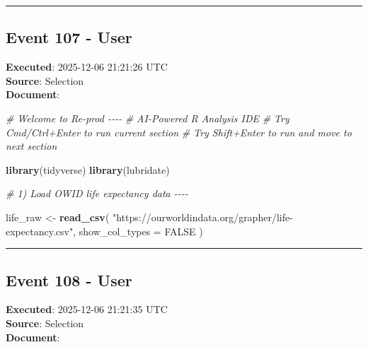 \documentclass[
  11pt,
]{article}
\newenvironment{Shaded}{\begin{snugshade}}{\end{snugshade}}
\newcommand{\AttributeTok}[1]{\textcolor[rgb]{0.13,0.29,0.53}{#1}}
\newcommand{\CommentTok}[1]{\textcolor[rgb]{0.56,0.35,0.01}{\textit{#1}}}
\newcommand{\ConstantTok}[1]{\textcolor[rgb]{0.56,0.35,0.01}{#1}}
\newcommand{\FunctionTok}[1]{\textcolor[rgb]{0.13,0.29,0.53}{\textbf{#1}}}
\newcommand{\NormalTok}[1]{#1}
\newcommand{\OtherTok}[1]{\textcolor[rgb]{0.56,0.35,0.01}{#1}}
\newcommand{\StringTok}[1]{\textcolor[rgb]{0.31,0.60,0.02}{#1}}
\begin{document}
\begin{center}\rule{0.5\linewidth}{0.5pt}\end{center}

\subsection{Event 107 - User}\label{event-107---user}

\textbf{Executed}: 2025-12-06 21:21:26 UTC\\
\textbf{Source}: Selection\\
\textbf{Document}:

\begin{Shaded}
\begin{Highlighting}[]
\CommentTok{\# Welcome to Re{-}prod {-}{-}{-}{-}}
\CommentTok{\# AI{-}Powered R Analysis IDE}
\CommentTok{\# Try Cmd/Ctrl+Enter to run current section}
\CommentTok{\# Try Shift+Enter to run and move to next section}

\FunctionTok{library}\NormalTok{(tidyverse)}
\FunctionTok{library}\NormalTok{(lubridate)}

\CommentTok{\# 1) Load OWID life expectancy data {-}{-}{-}{-}}

\NormalTok{life\_raw }\OtherTok{\textless{}{-}} \FunctionTok{read\_csv}\NormalTok{(}
  \StringTok{"https://ourworldindata.org/grapher/life{-}expectancy.csv"}\NormalTok{,}
  \AttributeTok{show\_col\_types =} \ConstantTok{FALSE}
\NormalTok{)}
\end{Highlighting}
\end{Shaded}

\begin{center}\rule{0.5\linewidth}{0.5pt}\end{center}

\subsection{Event 108 - User}\label{event-108---user}

\textbf{Executed}: 2025-12-06 21:21:35 UTC\\
\textbf{Source}: Selection\\
\textbf{Document}:
\end{document}
